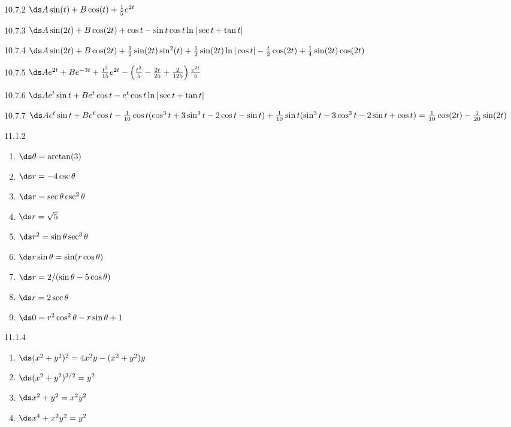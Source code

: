 \begin{Answer}{10.7.2}
 $\ds A\sin(t)+B\cos(t)+{1\over5}e^{2t}$
\end{Answer}
\begin{Answer}{10.7.3}
 $\ds A\sin(2t)+B\cos(2t)+\cos t-\sin t\cos t\ln|\sec t+\tan t|$
\end{Answer}
\begin{Answer}{10.7.4}
 $\ds A\sin(2t)+B\cos(2t)+{1\over2}\sin(2t)\sin^2(t)+
{1\over2}\sin(2t)\ln|\cos t|-{t\over2}\cos(2t)+{1\over4}\sin(2t)\cos(2t)$
\end{Answer}
\begin{Answer}{10.7.5}
 $\ds Ae^{2t}+Be^{-3t}+{t^3\over15}e^{2t}-\left({t^2\over5}
-{2t\over25}+{2\over125}\right){e^{2t}\over5}$
\end{Answer}
\begin{Answer}{10.7.6}
 $\ds Ae^{t}\sin t+Be^{t}\cos t-e^t\cos t\ln|\sec t+\tan t|$
\end{Answer}
\begin{Answer}{10.7.7}
 $\ds Ae^{t}\sin t+Be^{t}\cos t-
{1\over10}\cos t(\cos^3 t+3\sin^3 t-2\cos t-\sin t)+
{1\over10}\sin t(\sin^3 t-3\cos^3 t-2\sin t+\cos t)=
{1\over10}\cos(2t)-{1\over20}\sin(2t)$
\end{Answer}
\begin{Answer}{11.1.2}
\begin{multicols}{3}
\begin{enumerate}
	\item	$\ds \theta=\arctan(3)$
	\item	$\ds r=-4\csc\theta$
	\item	$\ds r=\sec\theta\csc^2\theta$
	\item	$\ds r=\sqrt{5}$
	\item	$\ds r^2=\sin\theta\sec^3\theta$
	\item	$\ds r\sin\theta=\sin(r\cos\theta)$
	\item	$\ds r=2/(\sin\theta-5\cos\theta)$
	\item	$\ds r=2\sec\theta$
	\item	$\ds 0=r^2\cos^2\theta-r\sin\theta+1$
\end{enumerate}
\end{multicols}
\end{Answer}
\begin{Answer}{11.1.4}
\begin{multicols}{2}
\begin{enumerate}
	\item	$\ds (x^2+y^2)^2=4x^2y-(x^2+y^2)y$
	\item	$\ds (x^2+y^2)^{3/2}=y^2$
	\item	$\ds x^2+y^2=x^2y^2$
	\item	$\ds x^4+x^2y^2=y^2$
\end{enumerate}
\end{multicols}
\end{Answer}
